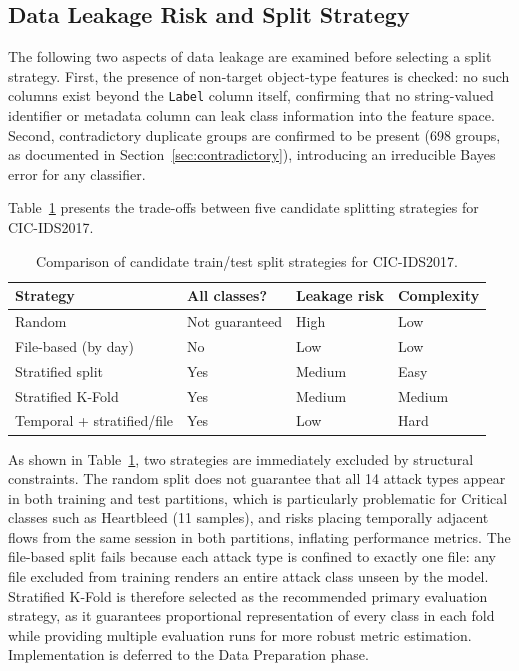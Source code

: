 \documentclass[12pt,a4paper]{article}
\begin{document}
\subsection{Data Leakage Risk and Split Strategy}

The following two aspects of data leakage are examined before selecting a split
strategy. First, the presence of non-target object-type features is checked: no
such columns exist beyond the \texttt{Label} column itself, confirming that no
string-valued identifier or metadata column can leak class information into the feature
space. Second, contradictory duplicate groups are confirmed to be present (698 groups,
as documented in Section~\ref{sec:contradictory}), introducing an irreducible Bayes
error for any classifier.

Table~\ref{tab:split_strategy} presents the trade-offs between five candidate
splitting strategies for CIC-IDS2017.

\begin{table}[H]
    \centering
    \caption{Comparison of candidate train/test split strategies for CIC-IDS2017.}
    \label{tab:split_strategy}
    \begin{tabular}{|l|l|l|l|}
        \hline
        \textbf{Strategy}          & \textbf{All classes?} & \textbf{Leakage risk} & \textbf{Complexity} \\
        \hline
        Random                     & Not guaranteed        & High                  & Low                 \\
        \hline
        File-based (by day)        & No                    & Low                   & Low                 \\
        \hline
        Stratified split           & Yes                   & Medium                & Easy                \\
        \hline
        Stratified K-Fold          & Yes                   & Medium                & Medium              \\
        \hline
        Temporal + stratified/file & Yes                   & Low                   & Hard                \\
        \hline
    \end{tabular}
\end{table}

As shown in Table~\ref{tab:split_strategy}, two strategies are immediately excluded
by structural constraints. The random split does not guarantee that all 14 attack types
appear in both training and test partitions, which is particularly problematic for
Critical classes such as Heartbleed (11 samples), and risks placing temporally adjacent
flows from the same session in both partitions, inflating performance metrics. The
file-based split fails because each attack type is confined to exactly one file: any
file excluded from training renders an entire attack class unseen by the model.
Stratified K-Fold is therefore selected as the recommended primary evaluation strategy,
as it guarantees proportional representation of every class in each fold while providing
multiple evaluation runs for more robust metric estimation. Implementation is deferred
to the Data Preparation phase.
\end{document}
